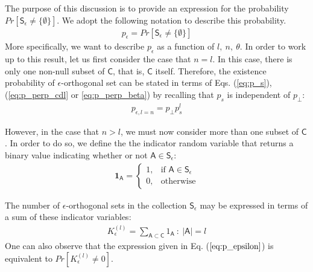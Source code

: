 The purpose of this discussion is to provide an expression for the probability $Pr[\mathsf{S}_\epsilon \neq \lbrace \emptyset \rbrace]$. We adopt the following notation to describe this probability.
 \begin{equation}\label{eq:p_epsilon}
    \begin{aligned}
        p_\epsilon = Pr[\mathsf{S}_\epsilon \neq \lbrace \emptyset \rbrace]
    \end{aligned}
\end{equation}
More specifically, we want to describe $p_\epsilon$ as a function of $l,\ n,\ \theta$. In order to work up to this result, let us first consider the case that $n=l$. In this case, there is only one non-null subset of $\mathsf{C}$, that is, $\mathsf{C}$ itself. Therefore, the existence probability of $\epsilon$-orthogonal set can be stated in terms of Eqs. (\ref{eq:p_s}), (\ref{eq:p_perp_cdl} or \ref{eq:p_perp_beta}) by recalling that $p_s$ is independent of $p_\perp$:
 \begin{equation}\label{eq:p_epsilon_l}
    \begin{aligned}
        p_{\epsilon,l=n} = p_\perp p_s^l
    \end{aligned}
\end{equation}

However, in the case that $n>l$, we must now consider more than one subset of $\mathsf{C}$. In order to do so, we define the the indicator random variable that returns a binary value indicating whether or not $\mathsf{A}\in \mathsf{S}_\epsilon$:
 \begin{equation}\label{eq:orth_indicator}
    \begin{aligned}
        \textbf{1}_{\mathsf{A}} = 
        \begin{cases}
            1,& \text{if } \mathsf{A} \in \mathsf{S}_\epsilon\\
            0,              & \text{otherwise}
        \end{cases}
    \end{aligned}
\end{equation}

The number of $\epsilon$-orthogonal sets in the collection $\mathsf{S}_\epsilon$ may be expressed in terms of a sum of these indicator variables:
 \begin{equation}\label{eq:indicator_sum}
    \begin{aligned}
        K_\epsilon^{(l)} = \sum_{\mathsf{A}\subset\mathsf{C}}1_{\mathsf{A}} \ : \ \vert \mathsf{A} \vert = l
    \end{aligned}
\end{equation}
One can also observe that the expression given in Eq. ($\ref{eq:p_epsilon}$) is equivalent to $Pr[ K_\epsilon^{(l)} \neq 0]$.

